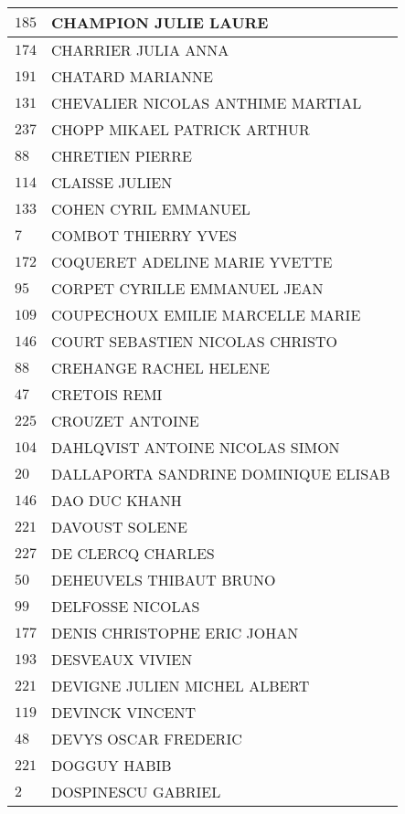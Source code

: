 \begin{xltabular}{\linewidth}{|l|X|}
    \hline
    $185$ & CHAMPION JULIE LAURE \\
    \hline
    $174$ & CHARRIER JULIA ANNA \\
    \hline
    $191$ & CHATARD MARIANNE \\
    \hline
    $131$ & CHEVALIER NICOLAS ANTHIME MARTIAL \\
    \hline
    $237$ & CHOPP MIKAEL PATRICK ARTHUR \\
    \hline
    $88$ & CHRETIEN PIERRE \\
    \hline
    $114$ & CLAISSE JULIEN \\
    \hline
    $133$ & COHEN CYRIL EMMANUEL \\
    \hline
    $7$ & COMBOT THIERRY YVES \\
    \hline
    $172$ & COQUERET ADELINE MARIE YVETTE \\
    \hline
    $95$ & CORPET CYRILLE EMMANUEL JEAN \\
    \hline
    $109$ & COUPECHOUX EMILIE MARCELLE MARIE \\
    \hline
    $146$ & COURT SEBASTIEN NICOLAS CHRISTO \\
    \hline
    $88$ & CREHANGE RACHEL HELENE \\
    \hline
    $47$ & CRETOIS REMI \\
    \hline
    $225$ & CROUZET ANTOINE \\
    \hline
    $104$ & DAHLQVIST ANTOINE NICOLAS SIMON \\
    \hline
    $20$ & DALLAPORTA SANDRINE DOMINIQUE ELISAB \\
    \hline
    $146$ & DAO DUC KHANH \\
    \hline
    $221$ & DAVOUST SOLENE \\
    \hline
    $227$ & DE CLERCQ CHARLES \\
    \hline
    $50$ & DEHEUVELS THIBAUT BRUNO \\
    \hline
    $99$ & DELFOSSE NICOLAS \\
    \hline
    $177$ & DENIS CHRISTOPHE ERIC JOHAN \\
    \hline
    $193$ & DESVEAUX VIVIEN \\
    \hline
    $221$ & DEVIGNE JULIEN MICHEL ALBERT \\
    \hline
    $119$ & DEVINCK VINCENT \\
    \hline
    $48$ & DEVYS OSCAR FREDERIC \\
    \hline
    $221$ & DOGGUY HABIB \\
    \hline
    $2$ & DOSPINESCU GABRIEL \\

\end{xltabular}
